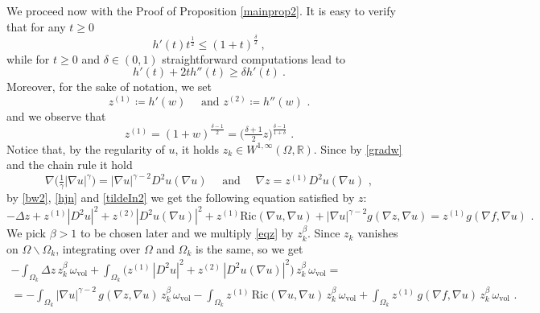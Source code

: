 \documentclass[10pt, a4paper, reqno, oneside]{amsart}
\theoremstyle{plain}
\theoremstyle{definition}
\theoremstyle{plain}
\theoremstyle{definition}
\theoremstyle{plain}
\renewcommand{\=}{:=}
\begin{document}
We proceed now with the Proof of Proposition \ref{mainprop2}. It is easy to verify that for any $t\geq0$
\begin{equation}\label{h1}
h'(t)t^{\frac12} \leq (1+t)^{\frac\delta2}\ ,
\end{equation}
while for $t\geq0$ and $\delta\in(0,1)$ straightforward computations lead to
\begin{equation}\label{h2}
h'(t) + 2th''(t) \geq \delta h'(t)\ .
\end{equation}
Moreover, for the sake of notation, we set
$$
z^{(1)} \coloneqq h'(w) \quad \text{ and } z^{(2)} \coloneqq h''(w) \,\, .
$$
and we observe that
\begin{equation} \label{h3}
z^{(1)} = (1+w)^{\frac{\delta-1}{2}}=\Big(\tfrac{\delta+1}{2}z \Big)^{\frac{\delta-1}{1+\delta}} \,\, .
\end{equation}
Notice that, by the regularity of $u$, it holds $z_k \in W^{1,\infty}(\Omega,\mathbb{R})$. Since by \eqref{gradw} and the chain rule it hold
$$
\nabla \big(\tfrac1{\gamma}|\nabla u|^{\gamma}\big) = |\nabla u|^{\gamma-2}D^2u(\nabla u) \quad \text{ and } \quad \nabla z = z^{(1)} D^2u(\nabla u) \,\, ,
$$
by
\eqref{bw2}, \eqref{hjn} and \eqref{tildeIn2} we get the following equation satisfied by $z$:
\begin{equation}\label{eqz}
-\Delta z +z^{(1)}|D^2u|^2 +z^{(2)}|D^2u(\nabla u)|^2 +z^{(1)}\mathrm{Ric}(\nabla u,\nabla u) +|\nabla u|^{\gamma-2}g(\nabla z,\nabla u) = z^{(1)}g(\nabla f,\nabla u) \,\, .
\end{equation}
We pick $\beta>1$ to be chosen later and we multiply \eqref{eqz} by $z_k^\beta$. Since $z_k$ vanishes on $\Omega\backslash\Omega_k$, integrating over $\Omega$ and $\Omega_k$ is the same, so we get
\begin{multline} \label{intEQ2}
-\int_{\Omega_k} \Delta z \, z_k^{\beta} \, \omega_{\mathrm{vol}}
+\int_{\Omega_k} \big(z^{(1)} \, |D^2u|^2  +z^{(2)} \, |D^2u(\nabla u)|^2\big) \, z_k^{\beta} \, \omega_{\mathrm{vol}} = \\
= -\int_{\Omega_k} |\nabla u|^{\gamma-2} \, g(\nabla z,\nabla u) \, z_k^{\beta} \, \omega_{\mathrm{vol}}
-\int_{\Omega_k} z^{(1)} \, \mathrm{Ric}(\nabla u,\nabla u) \, z_k^{\beta} \, \omega_{\mathrm{vol}}
+\int_{\Omega_k} z^{(1)} \, g(\nabla f,\nabla u) \, z_k^{\beta} \, \omega_{\mathrm{vol}} \,\, .
\end{multline}
\end{document}
